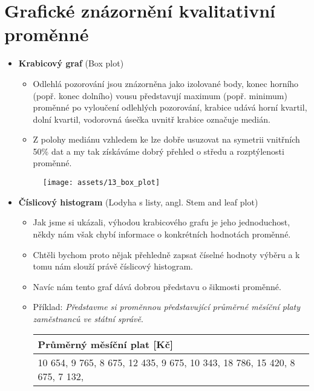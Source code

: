 \section{Grafické znázornění kvalitativní proměnné}
\begin{itemize}
    \item \textbf{Krabicový graf} (Box plot)
          \begin{itemize}
              \item Odlehlá pozorování jsou znázorněna jako izolované body, konec horního (popř. konec dolního) vousu představují maximum (popř. minimum) proměnné po vyloučení odlehlých pozorování, krabice udává horní kvartil,  dolní kvartil, vodorovná úsečka uvnitř krabice označuje medián.
              \item Z polohy mediánu vzhledem ke  lze dobře usuzovat na symetrii vnitřních 50\% dat a my tak získáváme dobrý přehled o středu a rozptýlenosti proměnné.
          \end{itemize}
          \begin{figure}[H]
              \centering
              \texttt{[image: assets/13\_box\_plot]}
          \end{figure}
    \item \textbf{Číslicový histogram} (Lodyha s listy, angl. Stem and leaf plot)
          \begin{itemize}
              \item Jak jsme si ukázali, výhodou krabicového grafu je jeho jednoduchost, někdy nám však chybí informace o konkrétních hodnotách proměnné.
              \item Chtěli bychom proto nějak přehledně zapsat číselné hodnoty výběru a k tomu nám slouží právě číslicový histogram.
              \item Navíc nám tento graf dává dobrou představu o šikmosti proměnné.
              \item Příklad: \textit{Představme si proměnnou představující průměrné měsíční platy zaměstnanců ve státní správě}.
                    \begin{table}[H]
                        \centering
                        \begin{tabular}{|l|}
                            \hline
                            \textbf{Průměrný měsíční plat [Kč]}                                       \\ \hline
                            10 654, 9 765, 8 675, 12 435, 9 675, 10 343, 18 786, 15 420, 8 675,	7 132, \\

\end{tabular}
\end{table}
\end{itemize}
\end{itemize}
